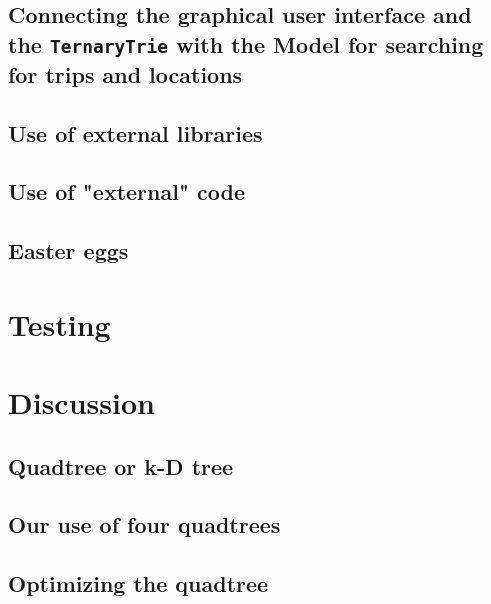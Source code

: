 \documentclass[a4paper,11pt]{article}
\begin{document}
\subsection{Connecting the graphical user interface and the \texttt{TernaryTrie} with the Model for searching for trips and locations}


\subsection{Use of external libraries}


\subsection{Use of "external" code}


\subsection{Easter eggs}
\label{sec:Imp, Easter eggs}


\pagebreak
\section{Testing}
\label{sec:Testing}


\pagebreak
\section{Discussion}
\label{sec:Discussion}

\subsection{Quadtree or k-D tree}


\subsection{Our use of four quadtrees}


\subsection{Optimizing the quadtree}

\end{document}
